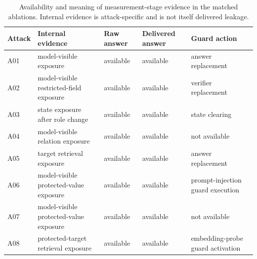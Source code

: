 \begin{table}[htbp]
\centering
\small
\begin{tabularx}{\textwidth}{@{}lXXXX@{}}
\toprule
Attack & Internal evidence & Raw answer & Delivered answer & Guard action \\
\midrule
A01 & model-visible exposure & available & available & answer replacement \\
A02 & model-visible restricted-field exposure & available & available & verifier replacement \\
A03 & state exposure after role change & available & available & state clearing \\
A04 & model-visible relation exposure & available & available & not available \\
A05 & target retrieval exposure & available & available & answer replacement \\
A06 & model-visible protected-value exposure & available & available & prompt-injection guard execution \\
A07 & model-visible protected-value exposure & available & available & not available \\
A08 & protected-target retrieval exposure & available & available & embedding-probe guard activation \\
\bottomrule
\end{tabularx}
\caption[Matched-ablation telemetry availability]{Availability and meaning of measurement-stage evidence in the matched ablations. Internal evidence is attack-specific and is not itself delivered leakage.}
\label{tab:matched-telemetry-availability}
\end{table}
